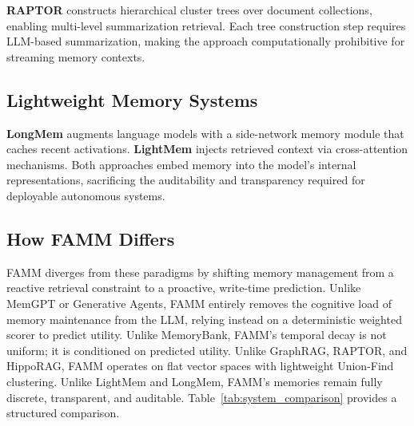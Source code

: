 \documentclass[conference]{IEEEtran}
\begin{document}
\textbf{RAPTOR} \cite{sarthi2024raptor} constructs hierarchical cluster trees over document collections, enabling multi-level summarization retrieval. Each tree construction step requires LLM-based summarization, making the approach computationally prohibitive for streaming memory contexts.

\subsection{Lightweight Memory Systems}
\textbf{LongMem} \cite{wang2023longmem} augments language models with a side-network memory module that caches recent activations. \textbf{LightMem} \cite{luo2023lightmem} injects retrieved context via cross-attention mechanisms. Both approaches embed memory into the model's internal representations, sacrificing the auditability and transparency required for deployable autonomous systems.

\subsection{How FAMM Differs}
FAMM diverges from these paradigms by shifting memory management from a reactive retrieval constraint to a proactive, write-time prediction. Unlike MemGPT or Generative Agents, FAMM entirely removes the cognitive load of memory maintenance from the LLM, relying instead on a deterministic weighted scorer to predict utility. Unlike MemoryBank, FAMM's temporal decay is not uniform; it is conditioned on predicted utility. Unlike GraphRAG, RAPTOR, and HippoRAG, FAMM operates on flat vector spaces with lightweight Union-Find clustering. Unlike LightMem and LongMem, FAMM's memories remain fully discrete, transparent, and auditable. Table~\ref{tab:system_comparison} provides a structured comparison.
\end{document}
